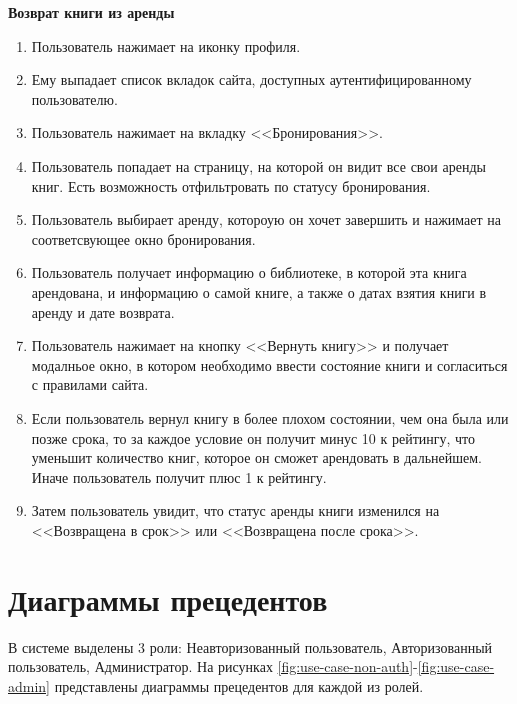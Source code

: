 \textbf{Возврат книги из аренды}
\begin{enumerate}
	\item Пользователь нажимает на иконку профиля.
	\item Ему выпадает список вкладок сайта, доступных аутентифицированному пользователю.
  \item Пользователь нажимает на вкладку <<Бронирования>>.
	\item Пользователь попадает на страницу, на которой он видит все свои аренды книг. Есть возможность отфильтровать по статусу бронирования.
	\item Пользователь выбирает аренду, котороую он хочет завершить и нажимает на соответсвующее окно бронирования.
	\item Пользователь получает информацию о библиотеке, в которой эта книга арендована, и информацию о самой книге, а также о датах взятия книги в аренду и дате возврата.
  \item Пользователь нажимает на кнопку <<Вернуть книгу>> и получает модалньое окно, в котором необходимо ввести состояние книги и согласиться с правилами сайта.
  \item Если пользователь вернул книгу в более плохом состоянии, чем она была или позже срока, то за каждое условие он получит минус 10 к рейтингу, что уменьшит количество книг, которое он сможет арендовать в дальнейшем. Иначе пользователь получит плюс 1 к рейтингу.
  \item Затем пользователь увидит, что статус аренды книги изменился на <<Возвращена в срок>> или <<Возвращена после срока>>.
\end{enumerate}


\section{Диаграммы прецедентов}
В системе выделены 3 роли: Неавторизованный пользователь, Авторизованный пользователь, Администратор. На рисунках \ref{fig:use-case-non-auth}-\ref{fig:use-case-admin} представлены диаграммы прецедентов для каждой из ролей.


